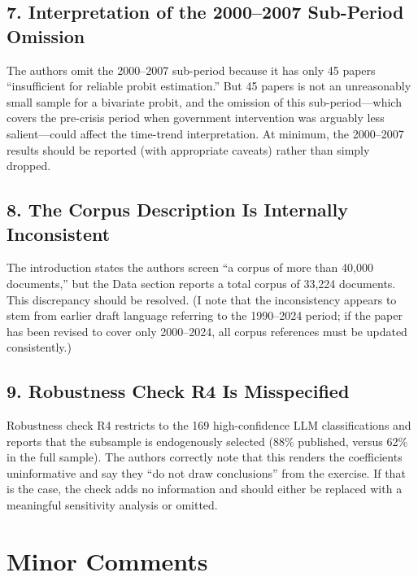 \documentclass[12pt]{article}
\begin{document}
\subsection*{7. Interpretation of the 2000--2007 Sub-Period Omission}

The authors omit the 2000--2007 sub-period because it has only 45 papers
``insufficient for reliable probit estimation.''  But 45 papers is not an
unreasonably small sample for a bivariate probit, and the omission of this
sub-period---which covers the pre-crisis period when government intervention
was arguably less salient---could affect the time-trend interpretation.  At
minimum, the 2000--2007 results should be reported (with appropriate caveats)
rather than simply dropped.

\subsection*{8. The Corpus Description Is Internally Inconsistent}

The introduction states the authors screen ``a corpus of more than 40,000
documents,'' but the Data section reports a total corpus of 33,224 documents.
This discrepancy should be resolved.  (I note that the inconsistency appears
to stem from earlier draft language referring to the 1990--2024 period;
if the paper has been revised to cover only 2000--2024, all corpus references
must be updated consistently.)

\subsection*{9. Robustness Check R4 Is Misspecified}

Robustness check R4 restricts to the 169 high-confidence LLM classifications
and reports that the subsample is endogenously selected (88\% published,
versus 62\% in the full sample).  The authors correctly note that this renders
the coefficients uninformative and say they ``do not draw conclusions'' from
the exercise.  If that is the case, the check adds no information and should
either be replaced with a meaningful sensitivity analysis or omitted.

\section{Minor Comments}
\end{document}
